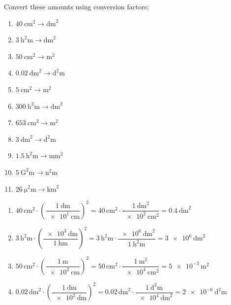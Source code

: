 \begin{exercise}
    Convert these amounts using conversion factors:
    \begin{enumerate}[label=\letraminuscula]
        \item \(\qty{40}{\square\cm} \to \unit{\square\dm}\)
        \item \(\qty{3}{\square\hecto\m} \to \unit{\square\dm}\)
        \item \(\qty{50}{\square\cm} \to \unit{\square\m}\)
        \item \(\qty{0.02}{\square\dm} \to \unit{\square\deca\m}\)
        \item \(\qty{5}{\square\cm} \to \unit{\square\m}\)
        \item \(\qty{300}{\square\hecto\m} \to \unit{\square\dm}\)
        \item \(\qty{653}{\square\cm} \to \unit{\square\m}\)
        \item \(\qty{3}{\square\dm} \to \unit{\square\deca\m}\)
        \item \(\qty{1.5}{\square\hecto\m} \to \unit{\square\mm}\)
        \item \(\qty{5}{\square\giga\m} \to \unit{\square\nano\m}\)
        \item \(\qty{26}{\square\micro\m} \to \unit{\square\km}\)
    \end{enumerate}
    \begin{solu}
        \begin{enumerate}[label=\alph*)]
            \item \(\num{40}\,\unit{\square\cm} \cdot \left(\dfrac{\qty{1}{\dm}}{\qty{e1}{\cm}}\right)^{2} = \num{40}\,\unit{\square\cm} \cdot \dfrac{\qty{1}{\square\dm}}{\qty{e2}{\square\cm}} = \qty{0.4}{\square\dm}\)
            \item \(\num{3}\,\unit{\square\hecto\m} \cdot \left(\dfrac{\qty{e3}{\dm}}{\qty{1}{\hecto\m}}\right)^{2} = \num{3}\,\unit{\square\hecto\m} \cdot \dfrac{\qty{e6}{\square\dm}}{\qty{1}{\square\hecto\m}} = \qty{3e6}{\square\dm}\)
            \item \(\num{50}\,\unit{\square\cm} \cdot \left(\dfrac{\qty{1}{\m}}{\qty{e2}{\cm}}\right)^{2} = \num{50}\,\unit{\square\cm} \cdot \dfrac{\qty{1}{\square\m}}{\qty{e4}{\square\cm}} = \qty{5e-3}{\square\m}\)
            \item \(\num{0.02}\,\unit{\square\dm} \cdot \left(\dfrac{\qty{1}{\deca\m}}{\qty{e2}{\dm}}\right)^{2} = \num{0.02}\,\unit{\square\dm} \cdot \dfrac{\qty{1}{\square\deca\m}}{\qty{e4}{\square\dm}} = \qty{2e-6}{\square\deca\m}\)

\end{enumerate}
\end{solu}
\end{exercise}
